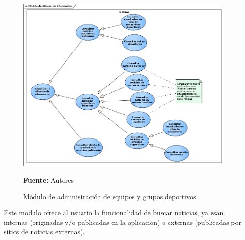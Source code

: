 \begin{figure}[!htb]
  \begin{center}
    \includegraphics[width=11cm]{./imagenes/casos_uso/difusion_informacion.png}
    \caption{Módulo de administración de equipos y grupos deportivos}
    \label{fig:cu_admin_equip_grup}
    \textbf{Fuente:} Autores
  \end{center}
\end{figure}

Este modulo ofrece al usuario la funcionalidad de buscar noticias, ya esan internas (originadas y/o publicadas en la aplicacion) o externas (publicadas por sitios de noticias externas).